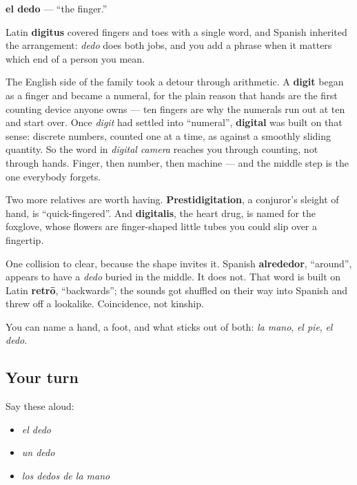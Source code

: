 \begin{cousinweb}
\textbf{el dedo} — \textquotedblleft{}the finger.\textquotedblright{}

Latin \textbf{digitus} covered fingers and toes with a single word, and Spanish inherited the arrangement: \emph{dedo} does both jobs, and you add a phrase when it matters which end of a person you mean.

The English side of the family took a detour through arithmetic. A \textbf{digit} began as a finger and became a numeral, for the plain reason that hands are the first counting device anyone owns — ten fingers are why the numerals run out at ten and start over. Once \emph{digit} had settled into \textquotedblleft{}numeral\textquotedblright{}, \textbf{digital} was built on that sense: discrete numbers, counted one at a time, as against a smoothly sliding quantity. So the word in \emph{digital camera} reaches you through counting, not through hands. Finger, then number, then machine — and the middle step is the one everybody forgets.

Two more relatives are worth having. \textbf{Prestidigitation}, a conjuror's sleight of hand, is \textquotedblleft{}quick-fingered\textquotedblright{}. And \textbf{digitalis}, the heart drug, is named for the foxglove, whose flowers are finger-shaped little tubes you could slip over a fingertip.

One collision to clear, because the shape invites it. Spanish \textbf{alrededor}, \textquotedblleft{}around\textquotedblright{}, appears to have a \emph{dedo} buried in the middle. It does not. That word is built on Latin \textbf{retrō}, \textquotedblleft{}backwards\textquotedblright{}; the sounds got shuffled on their way into Spanish and threw off a lookalike. Coincidence, not kinship.
\end{cousinweb}

\begin{grammarlens}[title={What you've built}]
You can name a hand, a foot, and what sticks out of both: \emph{la mano}, \emph{el pie}, \emph{el dedo}.
\end{grammarlens}

\subsection*{Your turn}
Say these aloud:

\begin{itemize}
\raggedright
  \item \emph{el dedo}
  \item \emph{un dedo}
  \item \emph{los dedos de la mano}
\end{itemize}

